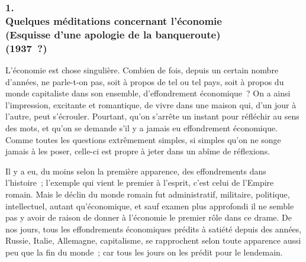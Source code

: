 \documentclass[french,twoside]{book} %
\begin{document}
\subsubsection[{1. Quelques méditations concernant l’économie, (Esquisse d'une apologie de la banqueroute) (1937 ?)}]{1. \\
Quelques méditations concernant l’économie \\
(Esquisse d'une apologie de la banqueroute) \\
(1937 ?)}
\noindent \par
L'économie est chose singulière. Combien de fois, depuis un certain nombre d'années, ne parle-t-on pas, soit à propos de tel ou tel pays, soit à propos du monde capitaliste dans son ensemble, d'effondrement économique ? On a ainsi l'impression, excitante et romantique, de vivre dans une maison qui, d'un jour à l'autre, peut s'écrouler. Pourtant, qu'on s'arrête un instant pour réfléchir au sens des mots, et qu'on se demande s'il y a jamais eu effondrement économique. Comme toutes les questions extrêmement simples, si simples qu'on ne songe jamais à les poser, celle-ci est propre à jeter dans un abîme de réflexions.\par
Il y a eu, du moins selon la première apparence, des effondrements dans l'histoire ; l'exemple qui vient le premier à l'esprit, c'est celui de l'Empire romain. Mais le déclin du monde romain fut administratif, militaire, politique, intellectuel, autant qu'économique, et sauf examen plus approfondi il ne semble pas y avoir de raison de donner à l'économie le premier rôle dans ce drame. De nos jours, tous les effondrements économiques prédits à satiété depuis des années, Russie, Italie, Allemagne, capitalisme, se rapprochent selon toute apparence aussi peu que la fin du monde ; car tous les jours on les prédit pour le lendemain.\par
\end{document}
